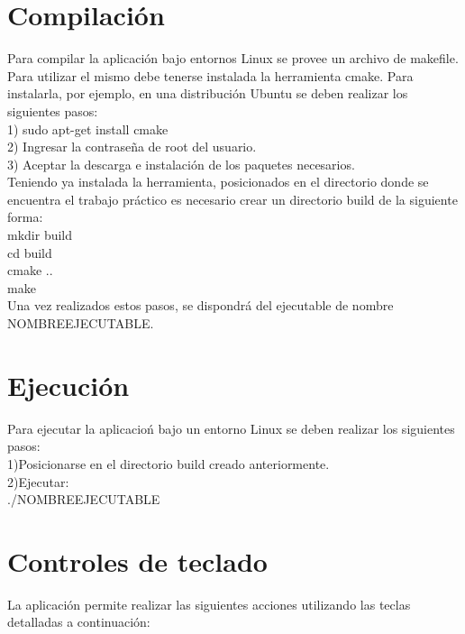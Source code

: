 \documentclass[11pt]{article}
\begin{document}
\section{Compilaci\'on}
  Para compilar la aplicaci\'on bajo entornos Linux se provee un archivo de makefile.
  Para utilizar el mismo debe tenerse instalada la herramienta cmake. Para instalarla, por ejemplo, en una distribuci\'on Ubuntu se deben 
realizar los siguientes pasos: \\
1) sudo apt-get install cmake \\
2) Ingresar la contrase\~na de root del usuario. \\
3) Aceptar la descarga e instalaci\'on de los paquetes necesarios. \\ 

Teniendo ya instalada la herramienta, posicionados en el directorio donde se encuentra el trabajo pr\'actico es necesario crear un directorio build
de la siguiente forma: \\
mkdir build \\
cd build \\
cmake .. \\
make \\

Una vez realizados estos pasos, se dispondr\'a del ejecutable de nombre NOMBREEJECUTABLE.

\section{Ejecuci\'on}

Para ejecutar la aplicacio\'n bajo un entorno Linux se deben realizar los siguientes pasos: \\
1)Posicionarse en el directorio build creado anteriormente. \\
2)Ejecutar: \\
./NOMBREEJECUTABLE 


\section{Controles de teclado}

La aplicaci\'on permite realizar las siguientes acciones utilizando las teclas detalladas a continuaci\'on: \\
\end{document}
